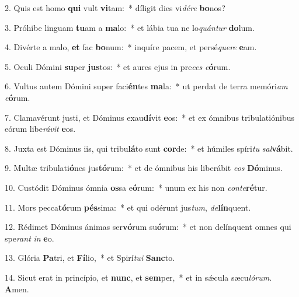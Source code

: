 2. Quis est homo \textbf{qui} vult \textbf{vi}tam:~*  díligit dies vi\textit{dé}\textit{re} \textbf{bo}nos?\

3. Próhibe linguam \textbf{tu}am a \textbf{ma}lo:~*  et lábia tua ne lo\textit{quán}\textit{tur} \textbf{do}lum.\

4. Divérte a malo, \textbf{et} fac \textbf{bo}num:~*  inquíre pacem, et persé\textit{que}\textit{re} \textbf{e}am.\

5. Oculi Dómini \textbf{su}per \textbf{jus}tos:~*  et aures ejus in pre\textit{ces} \textit{e}\textbf{ó}rum.\

6. Vultus autem Dómini super faci\textbf{én}tes \textbf{ma}la:~*  ut perdat de terra memóri\textit{am} \textit{e}\textbf{ó}rum.\

7. Clamavérunt justi, et Dóminus exau\textbf{dí}vit \textbf{e}os:~*  et ex ómnibus tribulatiónibus eórum libe\textit{rá}\textit{vit} \textbf{e}os.\

8. Juxta est Dóminus iis, qui tribu\textbf{lá}to sunt \textbf{cor}de:~*  et húmiles spíri\textit{tu} \textit{sal}\textbf{vá}bit.\

9. Multæ tribulati\textbf{ó}nes jus\textbf{tó}rum:~*  et de ómnibus his liberábit \textit{e}\textit{os} \textbf{Dó}minus.\

10. Custódit Dóminus ómnia \textbf{os}sa e\textbf{ó}rum:~*  unum ex his non \textit{con}\textit{te}\textbf{ré}tur.\

11. Mors pecca\textbf{tó}rum \textbf{pés}sima:~*  et qui odérunt jus\textit{tum}, \textit{de}\textbf{lín}quent.\

12. Rédimet Dóminus ánimas ser\textbf{vó}rum su\textbf{ó}rum:~*  et non delínquent omnes qui spe\textit{rant} \textit{in} \textbf{e}o.\

13. Glória \textbf{Pa}tri, et \textbf{Fí}lio,~*  et Spirí\textit{tu}\textit{i} \textbf{Sanc}to.\

14. Sicut erat in princípio, et \textbf{nunc}, et \textbf{sem}per,~*  et in sǽcula sæcu\textit{ló}\textit{rum}. \textbf{A}men.\

